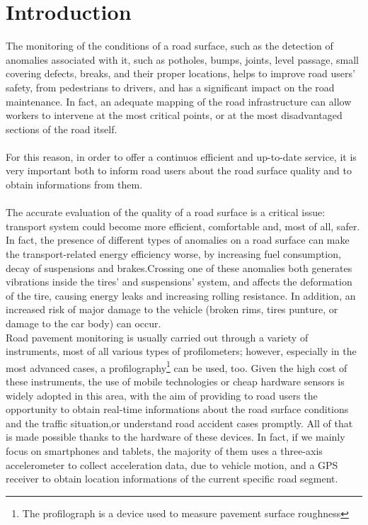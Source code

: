 \documentclass{standalone}
\begin{document}
\chapter{Introduction}
\label{Introduction}

The monitoring of the conditions of a road surface, such as the detection of anomalies associated with it, such as potholes, bumps, joints, level passage, small covering defects, breaks, and their proper locations, helps to improve road users' safety, from pedestrians to drivers, and has a significant impact on the road maintenance. In fact, an adequate mapping of the road infrastructure can allow workers to intervene at the most critical points, or at the most disadvantaged sections of the road itself.\\\\For this reason, in order to offer a continuos efficient and up-to-date service, it is very important both to inform road users about the road surface quality and to obtain informations from them.\\\\
The accurate evaluation of the quality of a road surface is a critical issue: transport system could become more efficient, comfortable and, most of all, safer. In fact, the presence of different types of anomalies on a road surface can make the transport-related energy efficiency worse, by increasing fuel consumption, decay of suspensions and brakes.\clearpage \noindent Crossing one of these anomalies both generates vibrations inside the tires' and suspensions' system, and affects the deformation of the tire, causing energy leaks and increasing rolling resistance. In addition, an increased risk of major damage to the vehicle (broken rims, tires punture, or damage to the car body) can occur.\\
Road pavement monitoring is usually carried out through a variety of instruments, most of all various types of profilometers; however, especially in the most advanced cases, a profilography\footnote{The profilograph is a device used to measure pavement surface roughness} can be used, too.
Given the high cost of these instruments, the use of mobile technologies or cheap hardware sensors is widely adopted in this area, with the aim of providing to road users the opportunity to obtain real-time informations about the road surface conditions and the traffic situation,or understand road accident cases promptly. All of that is made possible thanks to the hardware of these devices. In fact, if we mainly focus on smartphones and tablets, the majority of them uses a three-axis accelerometer to collect acceleration data, due to vehicle motion, and a GPS receiver to obtain location informations of the current specific road segment.\\
\end{document}
